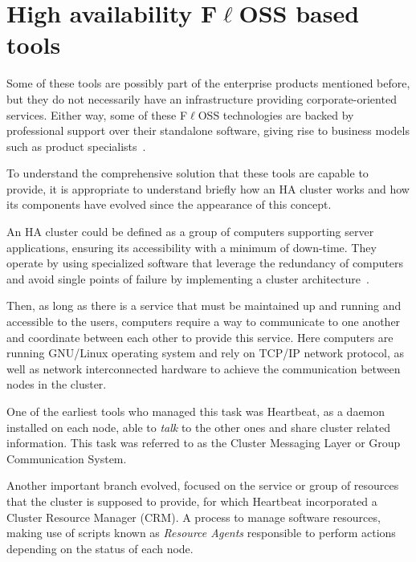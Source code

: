 \documentclass[a4paper, 12pt]{book}
\begin{document}
\section{High availability F$\ell$OSS based tools}
\label{sec:hafloss}


Some of these tools are possibly part of the enterprise products mentioned before, but they do not necessarily have an infrastructure providing corporate-oriented services. Either way, some of these F$\ell$OSS technologies are backed by professional support over their standalone software, giving rise to business models such as product specialists~\cite{Daffara1}.\bigskip

\noindent To understand the comprehensive solution that these tools are capable to provide, it is appropriate to understand briefly how an HA cluster works and how its components have evolved since the appearance of this concept.\bigskip

\noindent An HA cluster could be defined as a group of computers supporting server applications, ensuring its accessibility with a minimum of down-time. They operate by using specialized software that leverage the redundancy of computers and avoid single points of failure by implementing a cluster architecture~\cite{Weygant}.\bigskip

\noindent Then, as long as there is a service that must be maintained up and running and accessible to the users, computers require a way to communicate to one another and coordinate between each other to provide this service. Here computers are running GNU/Linux operating system and rely on TCP/IP network protocol, as well as network interconnected hardware to achieve the communication between nodes in the cluster.\bigskip

\noindent One of the earliest tools who managed this task was Heartbeat, as a daemon installed on each node, able to \textit{talk} to the other ones and share cluster related information. This task was referred to as the Cluster Messaging Layer or Group Communication System.\bigskip

\noindent Another important branch evolved, focused on the service or group of resources that the cluster is supposed to provide, for which Heartbeat incorporated a Cluster Resource Manager (CRM). A process to manage software resources, making use of scripts known as \textit{Resource Agents} responsible to perform actions depending on the status of each node.\bigskip
\end{document}
